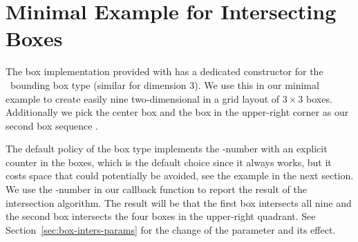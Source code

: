 



\section{Minimal Example for Intersecting Boxes}
\label{sec:box-intersect-minimal}

The box implementation provided with
 has a dedicated
constructor for the \cgal\ bounding box type 
(similar for dimension 3). We use this in our minimal example to
create easily nine two-dimensional  in a grid layout of $3
\times 3$ boxes. Additionally we pick the center box and the box in
the upper-right corner as our second box sequence .

The default policy of the box type implements the -number with
an explicit counter in the boxes, which is the default choice since it
always works, but it costs space that could potentially be avoided,
see the example in the next section. We use the -number in our
callback function to report the result of the intersection algorithm.
The result will be that the first  box intersects all nine
 and the second  box intersects the four boxes
in the upper-right quadrant. See Section~\ref{sec:box-inters-params}
for the change of the  parameter and its effect.

